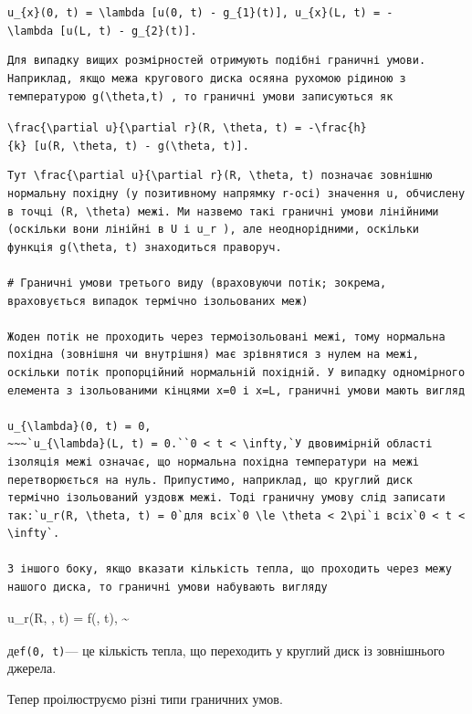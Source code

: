 \documentclass[
  ukrainian,
]{article}
\begin{document}
\texttt{u\_\{x\}(0,\ t)\ =\ \textbackslash{}lambda\ {[}u(0,\ t)\ -\ g\_\{1\}(t){]},\ u\_\{x\}(L,\ t)\ =\ -\textbackslash{}lambda\ {[}u(L,\ t)\ -\ g\_\{2\}(t){]}.}

\begin{verbatim}
Для випадку вищих розмірностей отримують подібні граничні умови. Наприклад, якщо межа кругового диска осяяна рухомою рідиною з температурою g(\theta,t) , то граничні умови записуються як
\end{verbatim}

\texttt{\textbackslash{}frac\{\textbackslash{}partial\ u\}\{\textbackslash{}partial\ r\}(R,\ \textbackslash{}theta,\ t)\ =\ -\textbackslash{}frac\{h\}\{k\}\ {[}u(R,\ \textbackslash{}theta,\ t)\ -\ g(\textbackslash{}theta,\ t){]}.}

\begin{verbatim}
Тут \frac{\partial u}{\partial r}(R, \theta, t) позначає зовнішню нормальну похідну (у позитивному напрямку r-осі) значення u, обчислену в точці (R, \theta) межі. Ми назвемо такі граничні умови лінійними (оскільки вони лінійні в U і u_r ), але неоднорідними, оскільки функція g(\theta, t) знаходиться праворуч.

# Граничні умови третього виду (враховуючи потік; зокрема, враховується випадок термічно ізольованих меж)

Жоден потік не проходить через термоізольовані межі, тому нормальна похідна (зовнішня чи внутрішня) має зрівнятися з нулем на межі, оскільки потік пропорційний нормальній похідній. У випадку одномірного елемента з ізольованими кінцями x=0 і x=L, граничні умови мають вигляд

u_{\lambda}(0, t) = 0,
~~~`u_{\lambda}(L, t) = 0.``0 < t < \infty,`У двовимірній області ізоляція межі означає, що нормальна похідна температури на межі перетворюється на нуль. Припустимо, наприклад, що круглий диск термічно ізольований уздовж межі. Тоді граничну умову слід записати так:`u_r(R, \theta, t) = 0`для всіх`0 \le \theta < 2\pi`і всіх`0 < t < \infty`.

З іншого боку, якщо вказати кількість тепла, що проходить через межу нашого диска, то граничні умови набувають вигляду
\end{verbatim}

u\_r(R, \theta, t) = f(\theta, t), \textsubscript{}\textasciitilde{}

де\texttt{f(0,\ t)}--- це кількість тепла, що переходить у круглий диск
із зовнішнього джерела.

Тепер проілюструємо різні типи граничних умов.
\end{document}
